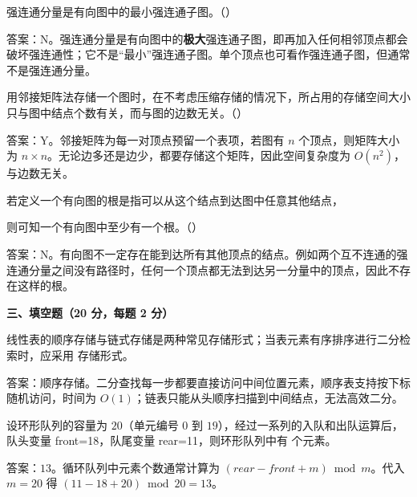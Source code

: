 \begin{question}
强连通分量是有向图中的最小强连通子图。（\quad）
\begin{solution}
答案：N。强连通分量是有向图中的\textbf{极大}强连通子图，即再加入任何相邻顶点都会破坏强连通性；它不是“最小”强连通子图。单个顶点也可看作强连通子图，但通常不是强连通分量。
\end{solution}
\end{question}

\begin{question}
用邻接矩阵法存储一个图时，在不考虑压缩存储的情况下，所占用的存储空间大小只与图中结点个数有关，而与图的边数无关。（\quad）
\begin{solution}
答案：Y。邻接矩阵为每一对顶点预留一个表项，若图有 $n$ 个顶点，则矩阵大小为 $n\times n$。无论边多还是边少，都要存储这个矩阵，因此空间复杂度为 $O(n^2)$，与边数无关。
\end{solution}
\end{question}

\begin{question}
若定义一个有向图的根是指可以从这个结点到达图中任意其他结点，\par
则可知一个有向图中至少有一个根。（\quad）
\begin{solution}
答案：N。有向图不一定存在能到达所有其他顶点的结点。例如两个互不连通的强连通分量之间没有路径时，任何一个顶点都无法到达另一分量中的顶点，因此不存在这样的根。
\end{solution}
\end{question}

\textbf{三、填空题（20 分，每题 2 分）}

\begin{question}
线性表的顺序存储与链式存储是两种常见存储形式；当表元素有序排序进行二分检索时，应采用 \blank 存储形式。
\begin{solution}
答案：顺序存储。二分查找每一步都要直接访问中间位置元素，顺序表支持按下标随机访问，时间为 $O(1)$；链表只能从头顺序扫描到中间结点，无法高效二分。
\end{solution}
\end{question}

\begin{question}
设环形队列的容量为 $20$（单元编号 $0$ 到 $19$），经过一系列的入队和出队运算后，队头变量 front=18，队尾变量 rear=11，则环形队列中有 \blank 个元素。
\begin{solution}
答案：$13$。循环队列中元素个数通常计算为 $(rear-front+m)\bmod m$。代入 $m=20$ 得 $(11-18+20)\bmod20=13$。
\end{solution}
\end{question}

